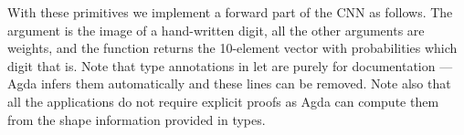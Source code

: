 With these primitives we implement a forward part of the CNN
as follows.  The  argument is the image of a hand-written digit, all
the other arguments are weights, and the function returns the 10-element vector
with probabilities which digit that is.  Note that type annotations in let are
purely for documentation --- Agda infers them automatically and these lines
can be removed.  Note also that all the  applications do not require
explicit proofs as Agda can compute them from the shape information provided
in types.
\begin{code}%
%
\>[2]%
\>[1730I]\AgdaSymbol{:}\AgdaSpace{}%
\AgdaSymbol{(}%
\>[18]\AgdaSymbol{:}%
\>[21]\AgdaSpace{}%
\AgdaSymbol{(}\AgdaSpace{}%
\AgdaSpace{}%
\AgdaSpace{}%
\AgdaSpace{}%
\AgdaInductiveConstructor{[]}\AgdaSymbol{)}\AgdaSpace{}%
\AgdaSymbol{)}\AgdaSpace{}%
\AgdaSpace{}%
\AgdaSymbol{(}\AgdaSpace{}%
\AgdaSymbol{:}\AgdaSpace{}%
\AgdaSpace{}%
\AgdaSymbol{(}\AgdaSpace{}%
\AgdaSpace{}%
\AgdaSpace{}%
\AgdaSpace{}%
\AgdaSpace{}%
\AgdaSpace{}%
\AgdaInductiveConstructor{[]}\AgdaSymbol{)}\AgdaSpace{}%
\AgdaSymbol{)}\<%
\\
\>[.][@{}l@{}]\<[1730I]%
\>[10]\AgdaSpace{}%
\AgdaSymbol{(}%
\>[18]\AgdaSymbol{:}%
\>[21]\AgdaSpace{}%
\AgdaSymbol{(}%
\>[28]\AgdaSpace{}%
\AgdaInductiveConstructor{[]}\AgdaSymbol{)}\AgdaSpace{}%
\AgdaSymbol{)}%
\>[42]\AgdaSpace{}%
\AgdaSymbol{(}\AgdaSpace{}%
\AgdaSymbol{:}\AgdaSpace{}%
\AgdaSpace{}%
\AgdaSymbol{(}\AgdaSpace{}%
\AgdaSpace{}%
\AgdaSpace{}%
\AgdaSpace{}%
\AgdaSpace{}%
\AgdaSpace{}%
\AgdaSpace{}%
\AgdaSpace{}%
\AgdaInductiveConstructor{[]}\AgdaSymbol{)}\AgdaSpace{}%
\AgdaSymbol{)}\<%
\\
%

\end{code}
